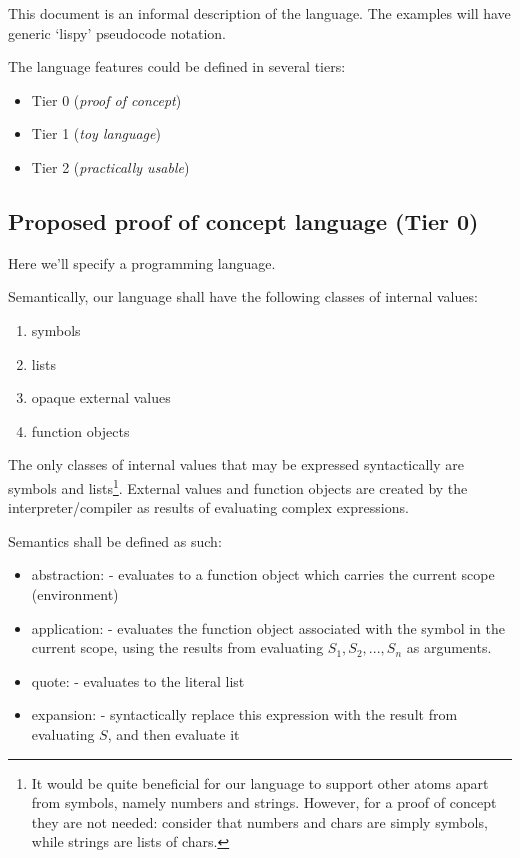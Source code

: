 \documentclass[main.tex]{subfiles}
\begin{document}
This document is an informal description of the language. The examples will
have generic `lispy' pseudocode notation.

The language features could be defined in several tiers:
\begin{itemize}
    \item Tier 0 (\emph{proof of concept})
    \item Tier 1 (\emph{toy language})
    \item Tier 2 (\emph{practically usable})
\end{itemize}

\subsection{Proposed proof of concept language (Tier 0)}

Here we'll specify a programming language.

Semantically, our language shall have the following classes of internal values:
\begin{enumerate}
    \item symbols
    \item lists
    \item opaque external values
    \item function objects
\end{enumerate}

The only classes of internal values that may be expressed syntactically are
symbols and lists\footnote{%
    It would be quite beneficial for our language to
    support other atoms apart from symbols, namely numbers and strings.
    However, for a proof of concept they are not needed: consider that numbers
    and chars are simply symbols, while strings are lists of chars.}.
External values and function objects are created by the interpreter/compiler as
results of evaluating complex expressions.

Semantics shall be defined as such:

\begin{itemize}
    \item abstraction:  - evaluates to
        a function object which carries the current scope (environment)
    \item application:  - evaluates the function
        object associated with the symbol  in the current scope,
        using the results from evaluating \(S_1, S_2, ..., S_n\) as arguments.
    \item quote:  - evaluates to the literal
        list 
    \item expansion:  - syntactically replace this expression
        with the result from evaluating \(S\), and then evaluate it
\end{itemize}
\end{document}
